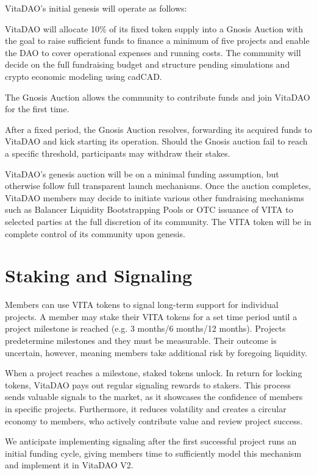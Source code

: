 \documentclass[10pt,letterpaper]{article}
\newenvironment{tight_enumerate}{
\begin{enumerate}
  \setlength{\itemsep}{0pt}
  \setlength{\parskip}{0pt}
}{\end{enumerate}}
\begin{document}
VitaDAO’s initial genesis will operate as follows:
 
\begin{tight_enumerate}
\item VitaDAO will allocate 10\% of its fixed token supply into a Gnosis Auction with the goal to raise sufficient funds to finance a minimum of five projects and enable the DAO to cover operational expenses and running costs. The community will decide on the full fundraising budget and structure pending simulations and crypto economic modeling using cadCAD. 
\item The Gnosis Auction allows the community to contribute funds and join VitaDAO for the first time. 
\item After a fixed period, the Gnosis Auction resolves, forwarding its acquired funds to VitaDAO and kick starting its operation. Should the Gnosis auction fail to reach a specific threshold, participants may withdraw their stakes.
\end{tight_enumerate}

VitaDAO’s genesis auction will be  on a minimal funding assumption, but otherwise follow full transparent launch mechanisms. Once the auction completes, VitaDAO members may decide to initiate various other fundraising mechanisms such as Balancer Liquidity Bootstrapping Pools or OTC issuance of VITA to selected parties at the full discretion of its community. The VITA token will be in complete control of its community upon genesis.

\section{Staking and Signaling}
Members can use VITA tokens to signal long-term support for individual projects. A member may stake their VITA tokens for a set time period until a project milestone is reached (e.g. 3 months/6 months/12 months). Projects predetermine milestones and they must be measurable. Their outcome is uncertain, however, meaning members take additional risk by foregoing liquidity. 

When a project reaches a milestone, staked tokens unlock. In return for locking tokens, VitaDAO pays out regular signaling rewards to stakers. This process sends valuable signals to the market, as it showcases the confidence of members in specific projects. Furthermore, it reduces volatility and creates a circular economy to members, who actively contribute value and review project success. 

We anticipate implementing signaling after the first successful project runs an initial funding cycle, giving members time to sufficiently model this mechanism and implement it in VitaDAO V2.
\end{document}
